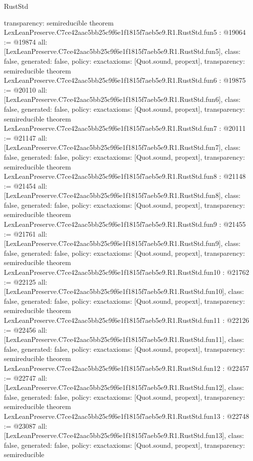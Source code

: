 \begin{lexlean}{RustStd}
\begin{coremodule}
{  transparency: semireducible
}
theorem LexLeanPreserve.C7ce42aac5bb25c9f6e1f1815f7aeb5e9.R1.RustStd.fun5 : @19064 := @19874 {
  all: [LexLeanPreserve.C7ce42aac5bb25c9f6e1f1815f7aeb5e9.R1.RustStd.fun5],
  class: false,
  generated: false,
  policy: exact{axioms: [Quot.sound, propext]},
  transparency: semireducible
}
theorem LexLeanPreserve.C7ce42aac5bb25c9f6e1f1815f7aeb5e9.R1.RustStd.fun6 : @19875 := @20110 {
  all: [LexLeanPreserve.C7ce42aac5bb25c9f6e1f1815f7aeb5e9.R1.RustStd.fun6],
  class: false,
  generated: false,
  policy: exact{axioms: [Quot.sound, propext]},
  transparency: semireducible
}
theorem LexLeanPreserve.C7ce42aac5bb25c9f6e1f1815f7aeb5e9.R1.RustStd.fun7 : @20111 := @21147 {
  all: [LexLeanPreserve.C7ce42aac5bb25c9f6e1f1815f7aeb5e9.R1.RustStd.fun7],
  class: false,
  generated: false,
  policy: exact{axioms: [Quot.sound, propext]},
  transparency: semireducible
}
theorem LexLeanPreserve.C7ce42aac5bb25c9f6e1f1815f7aeb5e9.R1.RustStd.fun8 : @21148 := @21454 {
  all: [LexLeanPreserve.C7ce42aac5bb25c9f6e1f1815f7aeb5e9.R1.RustStd.fun8],
  class: false,
  generated: false,
  policy: exact{axioms: [Quot.sound, propext]},
  transparency: semireducible
}
theorem LexLeanPreserve.C7ce42aac5bb25c9f6e1f1815f7aeb5e9.R1.RustStd.fun9 : @21455 := @21761 {
  all: [LexLeanPreserve.C7ce42aac5bb25c9f6e1f1815f7aeb5e9.R1.RustStd.fun9],
  class: false,
  generated: false,
  policy: exact{axioms: [Quot.sound, propext]},
  transparency: semireducible
}
theorem LexLeanPreserve.C7ce42aac5bb25c9f6e1f1815f7aeb5e9.R1.RustStd.fun10 : @21762 := @22125 {
  all: [LexLeanPreserve.C7ce42aac5bb25c9f6e1f1815f7aeb5e9.R1.RustStd.fun10],
  class: false,
  generated: false,
  policy: exact{axioms: [Quot.sound, propext]},
  transparency: semireducible
}
theorem LexLeanPreserve.C7ce42aac5bb25c9f6e1f1815f7aeb5e9.R1.RustStd.fun11 : @22126 := @22456 {
  all: [LexLeanPreserve.C7ce42aac5bb25c9f6e1f1815f7aeb5e9.R1.RustStd.fun11],
  class: false,
  generated: false,
  policy: exact{axioms: [Quot.sound, propext]},
  transparency: semireducible
}
theorem LexLeanPreserve.C7ce42aac5bb25c9f6e1f1815f7aeb5e9.R1.RustStd.fun12 : @22457 := @22747 {
  all: [LexLeanPreserve.C7ce42aac5bb25c9f6e1f1815f7aeb5e9.R1.RustStd.fun12],
  class: false,
  generated: false,
  policy: exact{axioms: [Quot.sound, propext]},
  transparency: semireducible
}
theorem LexLeanPreserve.C7ce42aac5bb25c9f6e1f1815f7aeb5e9.R1.RustStd.fun13 : @22748 := @23087 {
  all: [LexLeanPreserve.C7ce42aac5bb25c9f6e1f1815f7aeb5e9.R1.RustStd.fun13],
  class: false,
  generated: false,
  policy: exact{axioms: [Quot.sound, propext]},
  transparency: semireducible
}
\end{coremodule}
\end{lexlean}
